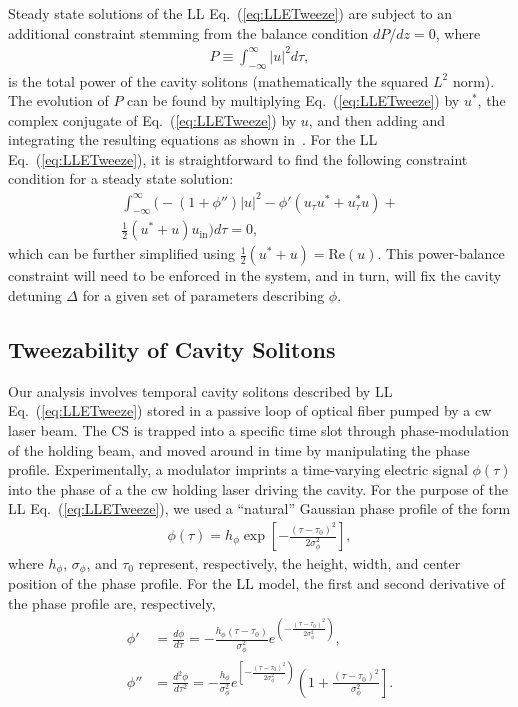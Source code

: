 \documentclass[aps,floatfix,showpacs,preprintnumbers,twocolumn,nofootinbib]{revtex4}
\begin{document}
Steady state solutions of the LL Eq.~(\ref{eq:LLETweeze}) are subject to an additional constraint stemming from the balance condition $dP/dz= 0$, where 
\begin{align}
P \equiv \int_{-\infty}^{\infty} |u|^2 d \tau,
\end{align}
is the total power of the cavity solitons (mathematically the squared $L^2$ norm).  The evolution of $P$ can be found by multiplying Eq.~(\ref{eq:LLETweeze}) by $u^*$, the complex conjugate of Eq.~(\ref{eq:LLETweeze}) by $u$, and then adding and integrating the resulting equations as shown in~\cite{Theocharis2006}.  For the LL Eq.~(\ref{eq:LLETweeze}), it is straightforward to find the following constraint condition for a steady state solution:
\begin{align}
\int_{-\infty}^{\infty} \Big( - (1 + \phi'') |u|^2 - \phi' \left(u_{\tau} u^* + u_{\tau}^* u \right) +\nonumber \\
 \frac{1}{2} (u^* + u ) u_{\mathrm{in}} \Big) d \tau = 0,
\label{LLConstraint}
\end{align} 
which can be further simplified using $\frac{1}{2} (u^* + u ) = \mathrm{Re} (u)$.  This power-balance constraint will need to be enforced in the system, and in turn, will fix the cavity detuning $\Delta$ for a given set of parameters describing $\phi$. 

\subsection{Tweezability of Cavity Solitons} 
\label{section:TweezePDE}
Our analysis involves temporal cavity solitons described by LL Eq.~(\ref{eq:LLETweeze}) stored in a passive loop of optical fiber pumped by a cw laser beam.  The CS is trapped into a specific time slot through phase-modulation of the holding beam, and moved around in time by manipulating the phase profile.  Experimentally, a modulator imprints a time-varying electric signal $\phi(\tau)$ into the phase of a the cw holding laser driving the cavity.  For the purpose of the LL Eq.~(\ref{eq:LLETweeze}), we used a ``natural'' Gaussian phase profile of the form
\begin{align}
\phi(\tau) = h_{\phi} \exp\left[ -\frac{(\tau - \tau_0)^2}{2 \sigma_{\phi}^2} \right],
\label{phi}
\end{align}
where $h_{\phi}$, $\sigma_{\phi}$, and $\tau_0$ represent, respectively, the height, width, and center position of the phase profile.  For the LL model, the first and second derivative of the phase profile are, respectively, 
\begin{align}
\phi' &= \frac{d \phi}{d \tau} = -\frac{h_{\phi} ( \tau - \tau_0)}{\sigma_{\phi}^2} e^{\left( -\frac{(\tau - \tau_0)^2}{2 \sigma_{\phi}^2}  \right)}\label{firstphi}, \\
\phi'' &= \frac{d^2 \phi}{d \tau^2} = -\frac{h_{\phi} }{\sigma_{\phi}^2} e^{ \left[ -\frac{(\tau - \tau_0)^2}{2 \sigma_{\phi}^2}  \right)} \left(1 +\frac{( \tau - \tau_0)^2}{\sigma_{\phi}^2}   \right]. \label{secondphi} 
\end{align}
\end{document}
